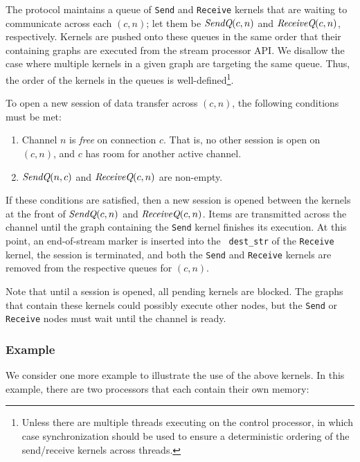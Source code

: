 The protocol maintains a queue of {\tt Send} and {\tt Receive} kernels
that are waiting to communicate across each $(c, n)$; let them be
$\mbox{\it SendQ}(c, n)$ and $\mbox{\it ReceiveQ}(c, n)$, respectively.  Kernels
are pushed onto these queues in the same order that their containing
graphs are executed from the stream processor API.  We disallow the
case where multiple kernels in a given graph are targeting the same
queue.  Thus, the order of the kernels in the queues is
well-defined\footnote{Unless there are multiple threads executing on
the control processor, in which case synchronization should be used to
ensure a deterministic ordering of the send/receive kernels across
threads.}.

To open a new session of data transfer across $(c, n)$, the following
conditions must be met:
\begin{enumerate}

\item Channel $n$ is {\it free} on connection $c$.  That is, no other
session is open on $(c, n)$, and $c$ has room for another active
channel.

\item $\mbox{\it SendQ}(n,c)$ and $\mbox{\it ReceiveQ}(c, n)$ are non-empty.

\end{enumerate}
If these conditions are satisfied, then a new session is opened
between the kernels at the front of $\mbox{\it SendQ}(c, n)$ and
$\mbox{\it ReceiveQ}(c, n)$.  Items are transmitted across the channel until
the graph containing the {\tt Send} kernel finishes its execution.  At
this point, an end-of-stream marker is inserted into the {\tt
dest\_str} of the {\tt Receive} kernel, the session is terminated, and
both the {\tt Send} and {\tt Receive} kernels are removed from the
respective queues for $(c, n)$.

Note that until a session is opened, all pending kernels are blocked.
The graphs that contain these kernels could possibly execute other
nodes, but the {\tt Send} or {\tt Receive} nodes must wait until the
channel is ready.

\subsubsection*{Example}

We consider one more example to illustrate the use of the above
kernels.  In this example, there are two processors that each contain
their own memory:

\begin{figure}[h]
\begin{center}
\end{center}
\vspace{-12pt}
\end{figure}

